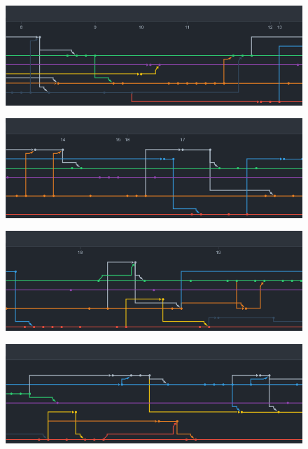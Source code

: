 			\begin{figure}[H]\centering
				\includegraphics[width=1\textwidth]{slike/image5.png}
				\caption{}
			\end{figure}
	
			\begin{figure}[H]\centering
				\includegraphics[width=1\textwidth]{slike/image6.png}
				\caption{}
			\end{figure}
		
			\begin{figure}[H]\centering
				\includegraphics[width=1\textwidth]{slike/image7.png}
				\caption{}
			\end{figure}
			
			\begin{figure}[H]\centering
				\includegraphics[width=1\textwidth]{slike/image8.png}
				\caption{}
			\end{figure}
		